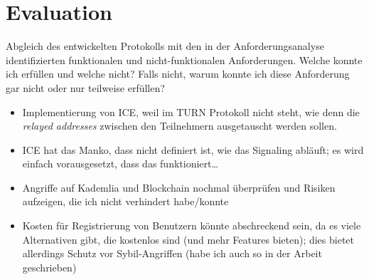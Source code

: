 \chapter{Evaluation}

Abgleich des entwickelten Protokolls mit den in der Anforderungsanalyse identifizierten funktionalen und
nicht-funktionalen Anforderungen. Welche konnte ich erfüllen und welche nicht? Falls nicht, warum
konnte ich diese Anforderung gar nicht oder nur teilweise erfüllen?

\begin{itemize}
    \item Implementierung von ICE, weil im TURN Protokoll nicht steht, wie denn die \textit{relayed addresses} zwischen den Teilnehmern ausgetauscht werden sollen.
    \item ICE hat das Manko, dass nicht definiert ist, wie das Signaling abläuft; es wird einfach vorausgesetzt, dass das funktioniert\dots
    \item Angriffe auf Kademlia und Blockchain nochmal überprüfen und Risiken aufzeigen, die ich nicht verhindert habe/konnte
    \item Kosten für Registrierung von Benutzern könnte abschreckend sein, da es viele Alternativen gibt, die kostenlos sind (und mehr Features bieten); dies bietet allerdings Schutz vor Sybil-Angriffen (habe ich auch so in der Arbeit geschrieben)
\end{itemize}